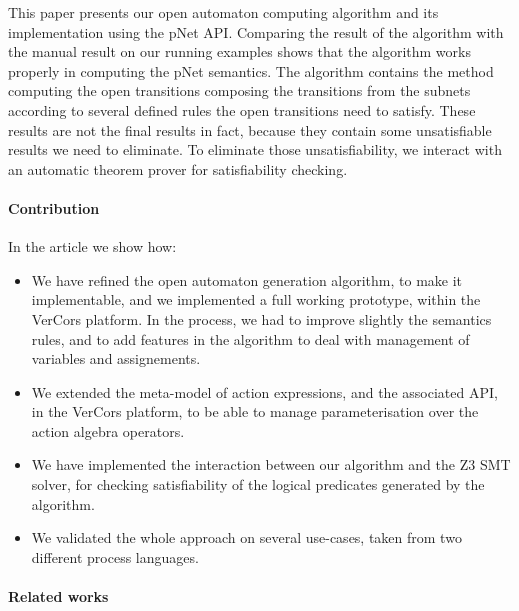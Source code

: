 \documentclass{lncs/llncs}
\newcommand{\TODO}[1]{\textcolor{red}{\textbf{[TODO:#1]}}}
\begin{document}
This paper presents our open automaton computing algorithm and its
implementation using the pNet API. Comparing the result of the algorithm with
the manual result on our running examples shows that the algorithm
works properly in computing the pNet semantics. The
algorithm contains the method computing the open transitions composing
the transitions from the subnets according to several defined rules
the open transitions need to satisfy. These results are not the final
results in fact, because they contain some unsatisfiable results we need
to eliminate. To eliminate those unsatisfiability, we interact with an
automatic theorem prover for satisfiability checking.

\paragraph{Contribution}
In the article we show how:
\begin{itemize}
\item We have refined the open automaton generation algorithm, to make
  it implementable, and we implemented a full working prototype, within the
  VerCors platform. In the process, we had to improve slightly the
  semantics rules, and to add features in the algorithm to deal with
  management of variables and assignements.
  \item We extended the meta-model of action expressions, and the
    associated API, in the VerCors platform, to be able to manage
    parameterisation over the action algebra operators.
  \item We have implemented the interaction between our algorithm and the Z3
    SMT solver, for checking satisfiability of the logical predicates
    generated by the algorithm.
    \item We validated the whole approach on several use-cases, taken
      from two different process languages.
\end{itemize}





\paragraph{Related works}

\end{document}

